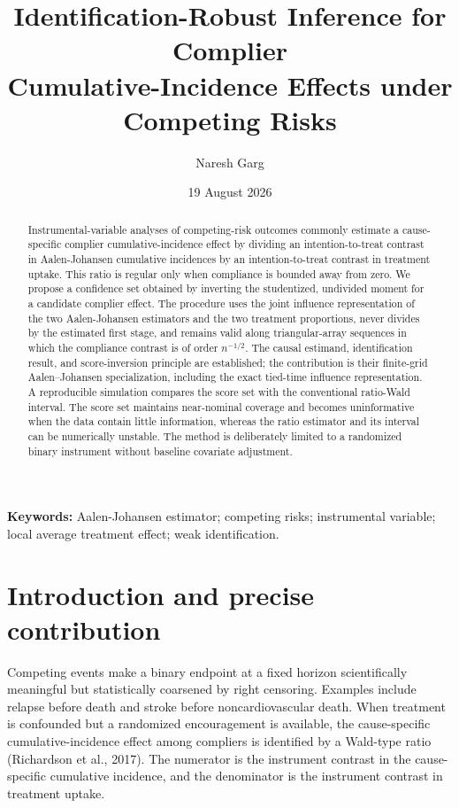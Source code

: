 \documentclass[
  10pt,
  letterpaper,
]{article}
\title{Identification-Robust Inference for Complier\\
Cumulative-Incidence Effects under Competing Risks}
\author{Naresh Garg}
\date{19 August 2026}
\begin{document}
\maketitle

\begin{abstract}

Instrumental-variable analyses of competing-risk outcomes commonly
estimate a cause-specific complier cumulative-incidence effect by
dividing an intention-to-treat contrast in Aalen-Johansen cumulative
incidences by an intention-to-treat contrast in treatment uptake. This
ratio is regular only when compliance is bounded away from zero. We
propose a confidence set obtained by inverting the studentized,
undivided moment for a candidate complier effect. The procedure uses the
joint influence representation of the two Aalen-Johansen estimators and
the two treatment proportions, never divides by the estimated first
stage, and remains valid along triangular-array sequences in which the
compliance contrast is of order $n^{-1/2}$. The causal estimand,
identification result, and score-inversion principle are established;
the contribution is their finite-grid Aalen--Johansen specialization,
including the exact tied-time influence representation. A reproducible simulation compares the score
set with the conventional ratio-Wald interval. The score set maintains
near-nominal coverage and becomes uninformative when the data contain
little information, whereas the ratio estimator and its interval can be
numerically unstable. The method is deliberately limited to a randomized
binary instrument without baseline covariate adjustment.
\end{abstract}

\textbf{Keywords:} Aalen-Johansen estimator; competing risks;
instrumental variable; local average treatment effect; weak
identification.

\section{Introduction and precise contribution}

Competing events make a binary endpoint at a fixed horizon
scientifically meaningful but statistically coarsened by right
censoring. Examples include relapse before death and stroke before
noncardiovascular death. When treatment is confounded but a randomized
encouragement is available, the cause-specific cumulative-incidence
effect among compliers is identified by a Wald-type ratio (Richardson et
al., 2017). The numerator is the instrument contrast in the
cause-specific cumulative incidence, and the denominator is the
instrument contrast in treatment uptake.
\end{document}
